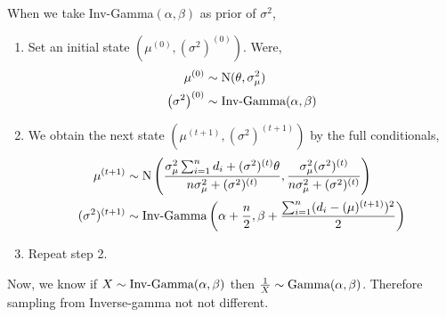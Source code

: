 \begin{example}
    When we take Inv-Gamma$(\alpha,\beta)$ as prior of $ \sigma^{2} $,
    \begin{enumerate}
        \item Set an initial state $ \left( \mu^{(0)}, (\sigma^{2})^{(0)}\right)$. Were,
            \begin{align*}
                \mu^{(0)} &\sim \text{N}(\theta,\sigma_{\mu}^{2}  ) \\ 
                \left(\sigma^{2}\right)^{(0)} &\sim \text{Inv-Gamma}(\alpha,\beta)  
            \end{align*}
        \item We obtain the next state $ \left( \mu^{(t+1)}, (\sigma^{2})^{(t+1)} \right) $ by the full conditionals,
            \begin{align*}
                \mu^{(t+1)} &\sim \text{N}\left( \frac{ \sigma_{\mu}^{2}\sum_{i=1}^{n} d_i + (\sigma^{2})^{(t)} \theta  }{ n \sigma_{\mu}^{2} + (\sigma^{2})^{(t)}  }, \frac{ \sigma_{\mu}^{2}(\sigma^{2})^{(t)}   }{ n \sigma_{\mu}^{2} + (\sigma^{2})^{(t)}  } \right) \\ 
                (\sigma^{2})^{(t+1)} &\sim \text{Inv-Gamma}\left( \alpha + \frac{ n }{ 2 }, \beta + \frac{ \sum_{i=1}^{n} (d_i-(\mu)^{(t+1)} )^{2} }{ 2 } \right)
            \end{align*}
            \item Repeat step 2.
    \end{enumerate}
    Now, we know if $ X\sim \text{Inv-Gamma}(\alpha,\beta) $ then $ \frac{ 1 }{ X } \sim \text{Gamma}(\alpha,\beta)$. Therefore sampling from Inverse-gamma not not different.


\end{example}
